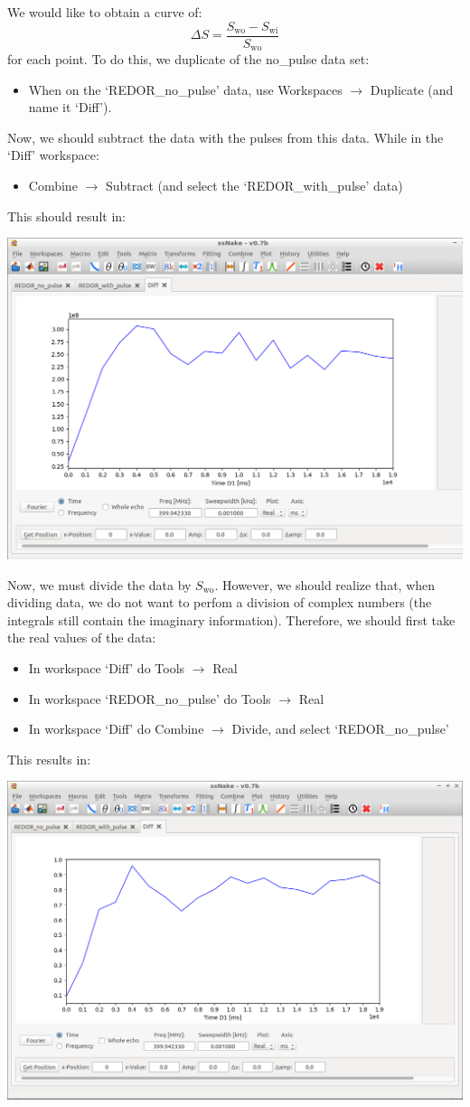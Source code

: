 \documentclass[11pt,a4paper]{article}
\begin{document}
We would like to obtain a curve of:
\begin{equation*}
  \Delta S = \frac{S_\text{wo} - S_\text{wi}}{S_\text{wo}}
\end{equation*}
for each point.
To do this, we duplicate of the no\_pulse data set:
\begin{itemize}
\item When on the `REDOR\_no\_pulse' data, use Workspaces $\longrightarrow$ Duplicate (and name it `Diff').
\end{itemize}
Now, we should subtract the data with the pulses from this data.
While in the `Diff' workspace:
\begin{itemize}
\item Combine $\longrightarrow$ Subtract (and select the `REDOR\_with\_pulse' data)
\end{itemize}
This should result in:
\begin{center}
\includegraphics[width=0.8\linewidth]{Figs/Fig4.png}
\end{center}
Now, we must divide the data by $S_\text{wo}$.
However, we should realize that, when dividing data, we do not want to perfom a division of complex numbers (the integrals still contain the imaginary information).
Therefore, we should first take the real values of the data:
\begin{itemize}
\item In workspace `Diff' do Tools $\longrightarrow$ Real
\item In workspace `REDOR\_no\_pulse' do Tools $\longrightarrow$ Real
\item In workspace `Diff' do  Combine $\longrightarrow$ Divide, and select `REDOR\_no\_pulse'
\end{itemize}
This results in:
\begin{center}
\includegraphics[width=0.8\linewidth]{Figs/Fig5.png}
\end{center}
\end{document}
